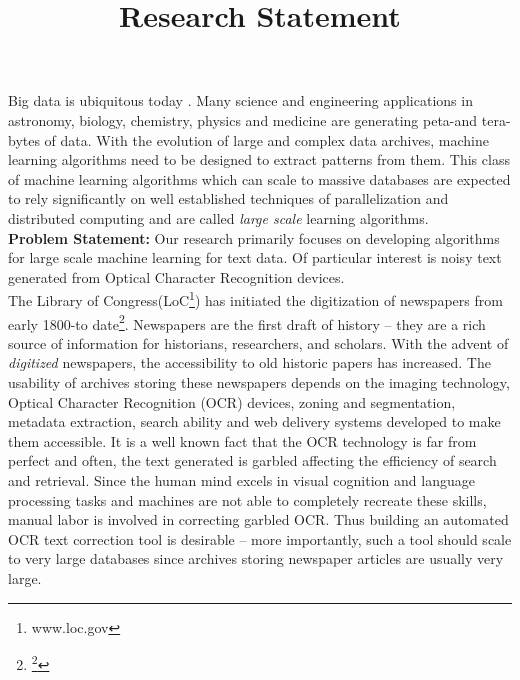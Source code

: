 \documentclass{article}
\title{Research Statement}
\date{}
\begin{document}
\maketitle

\noindent Big data is ubiquitous today \cite{Anand_13}. Many science and engineering applications in astronomy, biology, chemistry, physics and medicine are generating peta-and tera-bytes of data. With the evolution of large and complex data archives, machine learning algorithms need to be designed to extract patterns from them. This class of machine learning algorithms which can scale to massive databases are expected to rely significantly on well established techniques of parallelization and distributed computing and are called \emph{large scale} learning algorithms. \\


\noindent \textbf{Problem Statement: }Our research primarily focuses on developing algorithms for large scale machine learning for text data. Of particular interest is noisy text generated from Optical Character Recognition devices. \\

The Library of Congress(LoC\footnote{www.loc.gov}) has initiated the digitization of newspapers from early 1800-to date\footnote{\footnote{http://chroniclingamerica.loc.gov/}}. Newspapers are the first draft of history -- they are a rich source of information for historians, researchers, and scholars. With the advent of \emph{digitized} newspapers, the accessibility to old historic papers has increased. The usability of archives storing these newspapers depends on the imaging technology, Optical Character Recognition (OCR) devices, zoning and segmentation, metadata extraction, search ability and web delivery systems developed to make them accessible. It is a well known fact that the OCR technology is far from perfect and often, the text generated is garbled affecting the efficiency of search and retrieval. 
Since the human mind excels in visual cognition and language processing tasks and machines are not able to completely recreate these skills, manual labor is involved in correcting garbled OCR. Thus building an automated OCR text correction tool is desirable -- more importantly, such a tool should scale to very large databases since archives storing newspaper articles are usually very large. 
\end{document}
